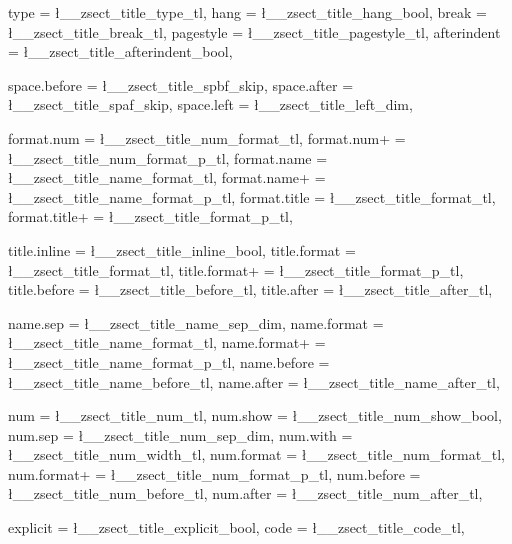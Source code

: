   {
    type            = \l__zsect_title_type_tl,
    hang            = \l__zsect_title_hang_bool,     %
    break           = \l__zsect_title_break_tl,      %
    pagestyle       = \l__zsect_title_pagestyle_tl,
    afterindent     = \l__zsect_title_afterindent_bool,

    space.before    = \l__zsect_title_spbf_skip,
    space.after     = \l__zsect_title_spaf_skip,
    space.left      = \l__zsect_title_left_dim,

    format.num      = \l__zsect_title_num_format_tl, 
    format.num+     = \l__zsect_title_num_format_p_tl, 
    format.name     = \l__zsect_title_name_format_tl, 
    format.name+    = \l__zsect_title_name_format_p_tl, 
    format.title    = \l__zsect_title_format_tl, 
    format.title+   = \l__zsect_title_format_p_tl, 

    title.inline    = \l__zsect_title_inline_bool,
    title.format    = \l__zsect_title_format_tl,
    title.format+   = \l__zsect_title_format_p_tl,
    title.before    = \l__zsect_title_before_tl,
    title.after     = \l__zsect_title_after_tl,

    name.sep        = \l__zsect_title_name_sep_dim,
    name.format     = \l__zsect_title_name_format_tl,
    name.format+    = \l__zsect_title_name_format_p_tl,
    name.before     = \l__zsect_title_name_before_tl,
    name.after      = \l__zsect_title_name_after_tl,

    num             = \l__zsect_title_num_tl,
    num.show        = \l__zsect_title_num_show_bool,
    num.sep         = \l__zsect_title_num_sep_dim,
    num.with        = \l__zsect_title_num_width_tl,  %
    num.format      = \l__zsect_title_num_format_tl,
    num.format+     = \l__zsect_title_num_format_p_tl,
    num.before      = \l__zsect_title_num_before_tl,
    num.after       = \l__zsect_title_num_after_tl,

    explicit        = \l__zsect_title_explicit_bool,
    code            = \l__zsect_title_code_tl,

}
